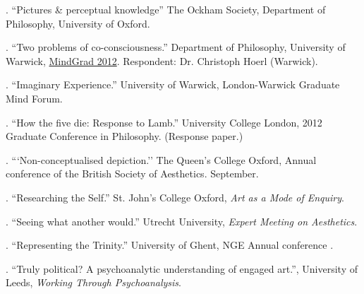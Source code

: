 \documentclass[11pt]{article}
\begin{document}
% 
% 
% 
% 
% 

\bigskip

\newpage
\medskip
{}. ``Pictures \& perceptual knowledge'' The Ockham Society, Department of Philosophy, University of Oxford.

. ``Two problems of co-consciousness.'' Department of Philosophy, University of Warwick, \href{http://www2.warwick.ac.uk/fac/soc/philosophy/news/conferences/mindgrad-2012/}{MindGrad 2012}. Respondent: Dr. Christoph Hoerl (Warwick).

. ``Imaginary Experience.'' University of Warwick, London-Warwick Graduate Mind Forum.

. ``How the five die: Response to Lamb.'' University College London, 2012 Graduate Conference in Philosophy. (Response paper.)

. ```Non-conceptualised depiction.'' The Queen's College Oxford, Annual conference of the British Society of Aesthetics. September.

. ``Researching the Self.'' St. John's College Oxford, \emph{Art as a Mode of Enquiry}.

. ``Seeing what another would.'' Utrecht University, \emph{Expert Meeting on Aesthetics}.

. ``Representing the Trinity.'' University of Ghent, NGE Annual conference .

. ``Truly political? A psychoanalytic understanding of engaged art.'', University of Leeds, \emph{Working Through Psychoanalysis}.

% 
\end{document}
